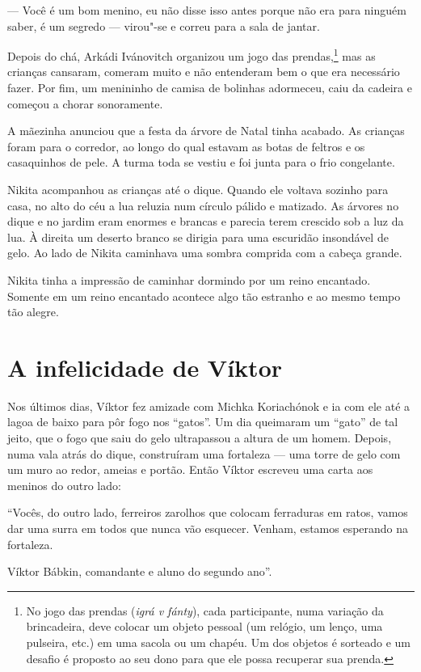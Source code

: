--- Você é um bom menino, eu não disse isso antes porque não era para
ninguém saber, é um segredo --- virou"-se e correu para a sala de jantar.

Depois do chá, Arkádi Ivánovitch organizou um jogo das
prendas,\footnote{No jogo das prendas (\emph{igrá v fánty}), cada
  participante, numa variação da brincadeira, deve colocar um objeto
  pessoal (um relógio, um lenço, uma pulseira, etc.) em uma sacola ou um
  chapéu. Um dos objetos é sorteado e um desafio é proposto ao seu dono
  para que ele possa recuperar sua prenda.} mas as crianças cansaram,
comeram muito e não entenderam bem o que era necessário fazer. Por fim,
um menininho de camisa de bolinhas adormeceu, caiu da cadeira e começou
a chorar sonoramente.

A mãezinha anunciou que a festa da árvore de Natal tinha acabado. As
crianças foram para o corredor, ao longo do qual estavam as botas de
feltros e os casaquinhos de pele. A turma toda se vestiu e foi junta
para o frio congelante.

Nikita acompanhou as crianças até o dique. Quando ele voltava sozinho
para casa, no alto do céu a lua reluzia num círculo pálido e matizado.
As árvores no dique e no jardim eram enormes e brancas e parecia terem
crescido sob a luz da lua. À direita um deserto branco se dirigia para
uma escuridão insondável de gelo. Ao lado de Nikita caminhava uma sombra
comprida com a cabeça grande.

Nikita tinha a impressão de caminhar dormindo por um reino encantado.
Somente em um reino encantado acontece algo tão estranho e ao mesmo
tempo tão alegre.

\chapter{A infelicidade de Víktor}

Nos últimos dias, Víktor fez amizade com Michka Koriachónok e ia com ele
até a lagoa de baixo para pôr fogo nos ``gatos''. Um dia queimaram um
``gato'' de tal jeito, que o fogo que saiu do gelo ultrapassou a altura
de um homem. Depois, numa vala atrás do dique, construíram uma fortaleza
--- uma torre de gelo com um muro ao redor, ameias e portão. Então
Víktor escreveu uma carta aos meninos do outro lado:

``Vocês, do outro lado, ferreiros zarolhos que colocam ferraduras em
ratos, vamos dar uma surra em todos que nunca vão esquecer. Venham,
estamos esperando na fortaleza.

Víktor Bábkin, comandante e aluno do segundo ano''.

